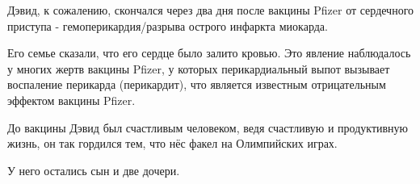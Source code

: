 Дэвид, к сожалению, скончался через два дня после вакцины Pfizer от сердечного
приступа - гемоперикардия/разрыва острого инфаркта миокарда.

Его семье сказали, что его сердце было залито кровью. Это явление наблюдалось у
многих жертв вакцины Pfizer, у которых перикардиальный выпот вызывает воспаление
перикарда (перикардит), что является известным отрицательным эффектом вакцины
Pfizer.

До вакцины Дэвид был счастливым человеком, ведя счастливую и продуктивную жизнь,
он так гордился тем, что нёс факел на Олимпийских играх.

У него остались сын и две дочери.
